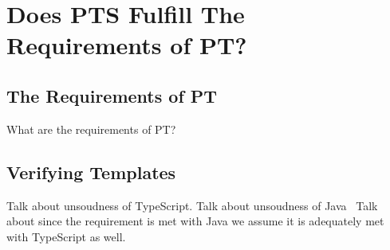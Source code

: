 \chapter{Does PTS Fulfill The Requirements of PT?}\label{ch:does-pts-fulfill-the-requirements-of-pt?}

\section{The Requirements of PT}\label{sec:the-requirements-of-pt}

What are the requirements of PT?

\section{Verifying Templates}\label{sec:pt-requirements-verifying-templates}

Talk about unsoudness of TypeScript.
Talk about unsoudness of Java~\cite{java-unsound}
Talk about since the requirement is met with Java we assume it is adequately met with TypeScript as well.


